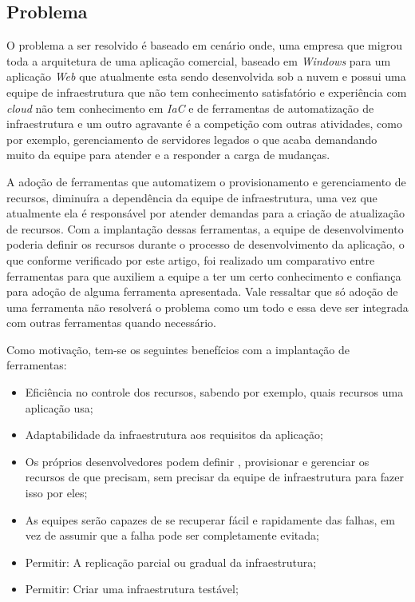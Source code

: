 \subsection{Problema}

O problema a ser resolvido é baseado em cenário onde, uma empresa que migrou toda a arquitetura de uma aplicação comercial, baseado em \textit{Windows} para um aplicação \textit{Web} que atualmente esta sendo desenvolvida sob a nuvem e possui uma equipe de infraestrutura que não tem conhecimento satisfatório e experiência com \textit{cloud} não tem conhecimento em \textit{IaC} e de ferramentas de automatização de infraestrutura e um outro agravante é a competição com outras atividades, como por exemplo, gerenciamento de servidores legados o que acaba demandando muito da equipe para atender e a responder a carga de mudanças.

 A adoção de ferramentas que automatizem o provisionamento e gerenciamento de recursos, diminuíra a dependência da equipe de infraestrutura, uma vez que atualmente ela é responsável por atender demandas para a criação de atualização de recursos. Com a implantação dessas ferramentas, a equipe de desenvolvimento poderia definir os recursos durante o processo de desenvolvimento da aplicação, o que conforme verificado por este artigo, foi realizado um comparativo entre ferramentas para que auxiliem a equipe a ter um certo conhecimento e confiança para adoção de alguma ferramenta apresentada. Vale ressaltar que só adoção de uma ferramenta não resolverá o problema como um todo e essa deve ser integrada com outras ferramentas quando necessário. 

  Como motivação, tem-se os seguintes benefícios com a implantação de ferramentas:  
\begin{itemize}
 \item Eficiência no controle dos recursos, sabendo por exemplo, quais recursos uma aplicação usa;
 \item Adaptabilidade da infraestrutura aos requisitos da aplicação;
 \item Os próprios desenvolvedores podem definir , provisionar e gerenciar os recursos de que precisam, sem precisar da equipe de infraestrutura para fazer isso por eles;

\item As equipes serão capazes de se recuperar fácil e rapidamente das falhas, em vez de assumir que a falha pode ser completamente evitada;

\item Permitir: A replicação parcial ou gradual da infraestrutura;

\item Permitir: Criar uma infraestrutura testável;
\end{itemize} 



